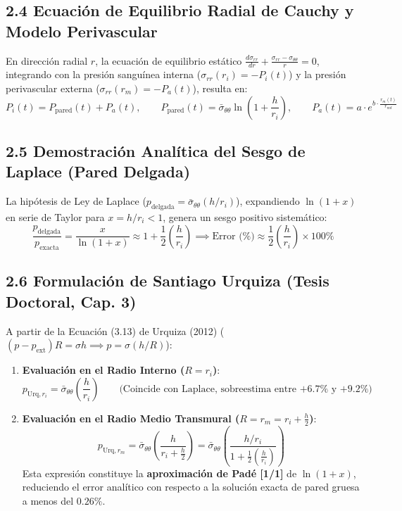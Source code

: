 \documentclass[10pt,a4paper]{article}
\begin{document}
\subsection{2.4 Ecuación de Equilibrio Radial de Cauchy y Modelo Perivascular}
En dirección radial $r$, la ecuación de equilibrio estático $\frac{d\sigma_{rr}}{dr} + \frac{\sigma_{rr} - \sigma_{\theta\theta}}{r} = 0$, integrando con la presión sanguínea interna ($\sigma_{rr}(r_i) = -P_i(t)$) y la presión perivascular externa ($\sigma_{rr}(r_m) = -P_a(t)$), resulta en:
\begin{equation}
P_i(t) = P_{\text{pared}}(t) + P_a(t), \qquad P_{\text{pared}}(t) = \bar{\sigma}_{\theta\theta} \ln\left(1 + \frac{h}{r_i}\right), \qquad P_a(t) = a \cdot e^{b \cdot \frac{r_m(t)}{r_{md}}}
\end{equation}

\subsection{2.5 Demostración Analítica del Sesgo de Laplace (Pared Delgada)}
La hipótesis de Ley de Laplace ($p_{\text{delgada}} = \bar{\sigma}_{\theta\theta}(h/r_i)$), expandiendo $\ln(1+x)$ en serie de Taylor para $x = h/r_i < 1$, genera un sesgo positivo sistemático:
\begin{equation}
\frac{p_{\text{delgada}}}{p_{\text{exacta}}} = \frac{x}{\ln(1+x)} \approx 1 + \frac{1}{2} \left( \frac{h}{r_i} \right) \implies \text{Error (\%)} \approx \frac{1}{2} \left( \frac{h}{r_i} \right) \times 100\%
\end{equation}

\subsection{2.6 Formulación de Santiago Urquiza (Tesis Doctoral, Cap. 3)}
A partir de la Ecuación (3.13) de Urquiza (2012) ($(p - p_{\text{ext}}) R = \sigma h \implies p = \sigma (h/R)$):
\begin{enumerate}
\item \textbf{Evaluación en el Radio Interno ($R = r_i$)}:
\begin{equation}
p_{\text{Urq}, r_i} = \bar{\sigma}_{\theta\theta} \left( \frac{h}{r_i} \right) \qquad \text{(Coincide con Laplace, sobreestima entre $+6.7\%$ y $+9.2\%$)}
\end{equation}
\item \textbf{Evaluación en el Radio Medio Transmural ($R = r_m = r_i + \frac{h}{2}$)}:
\begin{equation}
p_{\text{Urq}, r_m} = \bar{\sigma}_{\theta\theta} \left( \frac{h}{r_i + \frac{h}{2}} \right) = \bar{\sigma}_{\theta\theta} \left( \frac{h/r_i}{1 + \frac{1}{2}\left(\frac{h}{r_i}\right)} \right)
\end{equation}
Esta expresión constituye la \textbf{aproximación de Padé [1/1]} de $\ln(1+x)$, reduciendo el error analítico con respecto a la solución exacta de pared gruesa a menos del $0.26\%$.
\end{enumerate}
\end{document}
